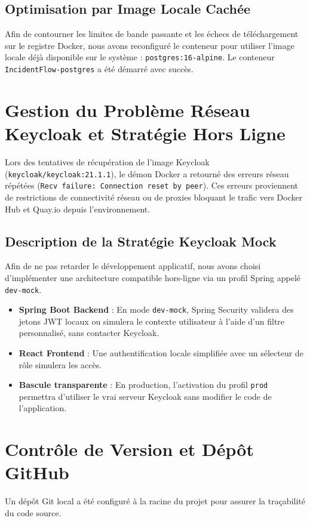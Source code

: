 \documentclass[12pt,a4paper]{article}
\begin{document}
\subsection{Optimisation par Image Locale Cachée}
Afin de contourner les limites de bande passante et les échecs de téléchargement sur le registre Docker, nous avons reconfiguré le conteneur pour utiliser l'image locale déjà disponible sur le système : \texttt{postgres:16-alpine}. Le conteneur \texttt{IncidentFlow-postgres} a été démarré avec succès.

\section{Gestion du Problème Réseau Keycloak et Stratégie Hors Ligne}
Lors des tentatives de récupération de l'image Keycloak (\texttt{keycloak/keycloak:21.1.1}), le démon Docker a retourné des erreurs réseau répétées (\texttt{Recv failure: Connection reset by peer}). Ces erreurs proviennent de restrictions de connectivité réseau ou de proxies bloquant le trafic vers Docker Hub et Quay.io depuis l'environnement.

\subsection{Description de la Stratégie Keycloak Mock}
Afin de ne pas retarder le développement applicatif, nous avons choisi d'implémenter une architecture compatible hors-ligne via un profil Spring appelé \texttt{dev-mock}.
\begin{itemize}
    \item \textbf{Spring Boot Backend} : En mode \texttt{dev-mock}, Spring Security validera des jetons JWT locaux ou simulera le contexte utilisateur à l'aide d'un filtre personnalisé, sans contacter Keycloak.
    \item \textbf{React Frontend} : Une authentification locale simplifiée avec un sélecteur de rôle simulera les accès.
    \item \textbf{Bascule transparente} : En production, l'activation du profil \texttt{prod} permettra d'utiliser le vrai serveur Keycloak sans modifier le code de l'application.
\end{itemize}

\section{Contrôle de Version et Dépôt GitHub}
Un dépôt Git local a été configuré à la racine du projet pour assurer la traçabilité du code source.
\end{document}
